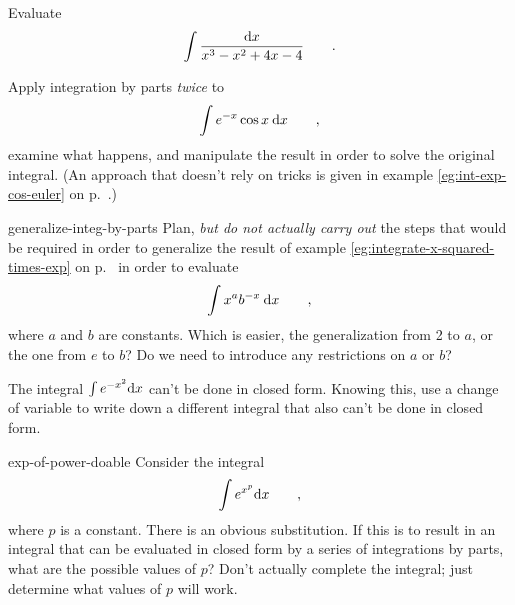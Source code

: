 \begin{hwsection}
\begin{hw}
Evaluate
\begin{equation*}
  \int \frac{\textup{d} x}{x^3-x^2+4x-4} \qquad .
\end{equation*}
\end{hw}

\begin{hw}\label{hw:integration-by-parts-twice-trick}
Apply integration by parts \emph{twice} to
\begin{equation*}
  \int e^{-x}\cos x \:\textup{d} x \qquad ,
\end{equation*}
examine what happens, and manipulate the result in order to solve the original integral.
(An approach that doesn't rely on tricks is given in example \ref{eg:int-exp-cos-euler} on p.~\pageref{eg:int-exp-cos-euler}.)
\end{hw}

\begin{hwwithsoln}{generalize-integ-by-parts}
Plan, \emph{but do not actually carry out} the steps that would be required in order to generalize
the result of example \ref{eg:integrate-x-squared-times-exp} on p.~\pageref{eg:integrate-x-squared-times-exp}
in order to evaluate
\begin{equation*}
  \int x^a b^{-x} \:\textup{d} x \qquad ,
\end{equation*}
where $a$ and $b$ are constants.
Which is easier, the generalization from 2 to $a$, or the one from $e$ to $b$?
Do we need to introduce any restrictions on $a$ or $b$?
\end{hwwithsoln}

\begin{hw}
The integral $\int e^{-x^2}\textup{d} x$ can't be done in closed form. Knowing this, use a change
of variable to write down a different integral that also can't be done in closed form.
\end{hw}

\begin{hwwithsoln}{exp-of-power-doable}
Consider the integral
\begin{equation*}
  \int e^{x^p} \textup{d} x \qquad ,
\end{equation*}
where $p$ is a constant. There is an obvious substitution. If this is to result in
an integral that can be evaluated in closed form by a series of integrations by parts,
what are the possible values of $p$? Don't actually complete the integral; just determine
what values of $p$ will work.
\end{hwwithsoln}

\end{hwsection}
